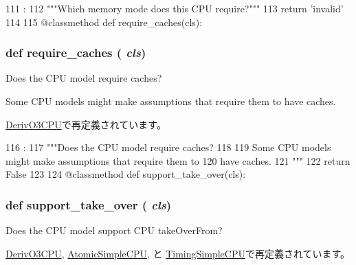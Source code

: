 \begin{DoxyCode}
111                         :
112         """Which memory mode does this CPU require?"""
113         return 'invalid'
114 
115     @classmethod
    def require_caches(cls):
\end{DoxyCode}
\hypertarget{classBaseCPU_1_1BaseCPU_afcb2c5440cbf782e304bdb958eadf744}{
\subsubsection[{require\_\-caches}]{\setlength{\rightskip}{0pt plus 5cm}def require\_\-caches ( {\em cls})}}
\label{classBaseCPU_1_1BaseCPU_afcb2c5440cbf782e304bdb958eadf744}
\begin{DoxyVerb}Does the CPU model require caches?

Some CPU models might make assumptions that require them to
have caches.
\end{DoxyVerb}
 

\hyperlink{classO3CPU_1_1DerivO3CPU_afcb2c5440cbf782e304bdb958eadf744}{DerivO3CPU}で再定義されています。


\begin{DoxyCode}
116                            :
117         """Does the CPU model require caches?
118 
119         Some CPU models might make assumptions that require them to
120         have caches.
121         """
122         return False
123 
124     @classmethod
    def support_take_over(cls):
\end{DoxyCode}
\hypertarget{classBaseCPU_1_1BaseCPU_aa201537acf29724056129b8efad43371}{
\subsubsection[{support\_\-take\_\-over}]{\setlength{\rightskip}{0pt plus 5cm}def support\_\-take\_\-over ( {\em cls})}}
\label{classBaseCPU_1_1BaseCPU_aa201537acf29724056129b8efad43371}
\begin{DoxyVerb}Does the CPU model support CPU takeOverFrom?\end{DoxyVerb}
 

\hyperlink{classO3CPU_1_1DerivO3CPU_aa201537acf29724056129b8efad43371}{DerivO3CPU}, \hyperlink{classAtomicSimpleCPU_1_1AtomicSimpleCPU_aa201537acf29724056129b8efad43371}{AtomicSimpleCPU}, と \hyperlink{classTimingSimpleCPU_1_1TimingSimpleCPU_aa201537acf29724056129b8efad43371}{TimingSimpleCPU}で再定義されています。


